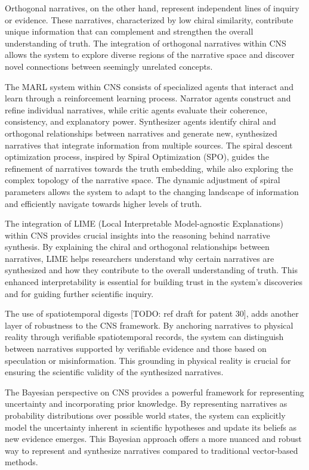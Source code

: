\documentclass[12pt, a4paper]{article}
\begin{document}
Orthogonal narratives, on the other hand, represent independent lines of inquiry or evidence.  These narratives, characterized by low chiral similarity, contribute unique information that can complement and strengthen the overall understanding of truth. The integration of orthogonal narratives within CNS allows the system to explore diverse regions of the narrative space and discover novel connections between seemingly unrelated concepts.

The MARL system within CNS consists of specialized agents that interact and learn through a reinforcement learning process.  Narrator agents construct and refine individual narratives, while critic agents evaluate their coherence, consistency, and explanatory power.  Synthesizer agents identify chiral and orthogonal relationships between narratives and generate new, synthesized narratives that integrate information from multiple sources.  The spiral descent optimization process, inspired by Spiral Optimization (SPO), guides the refinement of narratives towards the truth embedding, while also exploring the complex topology of the narrative space.  The dynamic adjustment of spiral parameters allows the system to adapt to the changing landscape of information and efficiently navigate towards higher levels of truth.

The integration of LIME (Local Interpretable Model-agnostic Explanations) within CNS provides crucial insights into the reasoning behind narrative synthesis.  By explaining the chiral and orthogonal relationships between narratives, LIME helps researchers understand why certain narratives are synthesized and how they contribute to the overall understanding of truth.  This enhanced interpretability is essential for building trust in the system's discoveries and for guiding further scientific inquiry.

The use of spatiotemporal digests [TODO: ref draft for patent 30], adds another layer of robustness to the CNS framework.  By anchoring narratives to physical reality through verifiable spatiotemporal records, the system can distinguish between narratives supported by verifiable evidence and those based on speculation or misinformation.  This grounding in physical reality is crucial for ensuring the scientific validity of the synthesized narratives.

The Bayesian perspective on CNS provides a powerful framework for representing uncertainty and incorporating prior knowledge.  By representing narratives as probability distributions over possible world states, the system can explicitly model the uncertainty inherent in scientific hypotheses and update its beliefs as new evidence emerges.  This Bayesian approach offers a more nuanced and robust way to represent and synthesize narratives compared to traditional vector-based methods.
\end{document}
